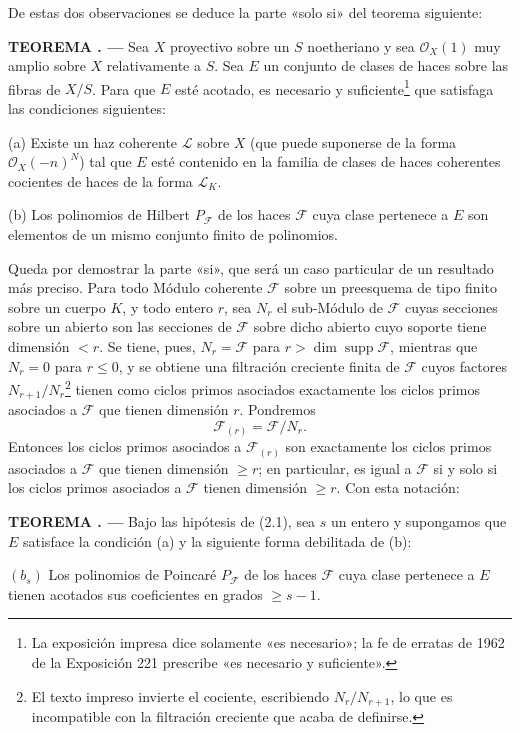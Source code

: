 \documentclass[11pt,twoside,openany]{book}
\numberwithin{equation}{section}
\theoremstyle{plain}
\theoremstyle{definition}
\theoremstyle{remark}
\newcommand{\result}[2]{%
  \par\medskip\noindent\textbf{#1%
  \if\relax\detokenize{#2}\relax\else\space#2\fi. ---}\enspace
}
\theoremstyle{plain}
\theoremstyle{definition}
\theoremstyle{remark}
\begin{document}
De estas dos observaciones se deduce la parte «solo si» del teorema siguiente:

\result{TEOREMA}{2.1} Sea $X$ proyectivo sobre un $S$ noetheriano y sea
$\mathcal O_X(1)$ muy amplio sobre $X$ relativamente a $S$. Sea $E$ un
conjunto de clases de haces sobre las fibras de $X/S$. Para que $E$ esté
acotado, es necesario y suficiente\footnote{La exposición impresa dice
solamente «es necesario»; la fe de erratas de 1962 de la Exposición 221 prescribe «es
necesario y suficiente».} que satisfaga las condiciones siguientes:

\medskip
\noindent (a) Existe un haz coherente $\mathcal L$ sobre $X$ (que puede
suponerse de la forma $\mathcal O_X(-n)^N$) tal que $E$ esté contenido en la
familia de clases de haces coherentes cocientes de haces de la forma
$\mathcal L_K$.

\smallskip
\noindent (b) Los polinomios de Hilbert $P_{\mathcal F}$ de los haces
$\mathcal F$ cuya clase pertenece a $E$ son elementos de un mismo conjunto
finito de polinomios.

Queda por demostrar la parte «si», que será un caso particular de un resultado
más preciso. Para todo Módulo coherente $\mathcal F$ sobre un preesquema de
tipo finito sobre un cuerpo $K$, y todo entero $r$, sea $N_r$ el sub-Módulo de
$\mathcal F$ cuyas secciones sobre un abierto son las secciones de $\mathcal F$
sobre dicho abierto cuyo soporte tiene dimensión $<r$. Se tiene, pues,
$N_r=\mathcal F$ para $r>\dim\operatorname{supp}\mathcal F$, mientras que
$N_r=0$ para $r\leq0$, y se obtiene una filtración creciente finita de
$\mathcal F$ cuyos factores $N_{r+1}/N_r$\footnote{El texto impreso invierte
el cociente, escribiendo $N_r/N_{r+1}$, lo que es incompatible con la
filtración creciente que acaba de definirse.} tienen como ciclos primos
asociados exactamente los ciclos primos asociados a $\mathcal F$ que tienen
dimensión $r$. Pondremos
\[
\mathcal F_{(r)}=\mathcal F/N_r.
\]
Entonces los ciclos primos asociados a $\mathcal F_{(r)}$ son exactamente los
ciclos primos asociados a $\mathcal F$ que tienen dimensión $\geq r$; en
particular, es igual a $\mathcal F$ si y solo si los ciclos primos asociados a
$\mathcal F$ tienen dimensión $\geq r$. Con esta notación:

\result{TEOREMA}{2.2} Bajo las hipótesis de (2.1), sea $s$ un entero y
supongamos que $E$ satisface la condición (a) y la siguiente forma debilitada
de (b):

\medskip
\noindent $(b_s)$ Los polinomios de Poincaré $P_{\mathcal F}$ de los haces
$\mathcal F$ cuya clase pertenece a $E$ tienen acotados sus coeficientes en
grados $\geq s-1$.
\end{document}

